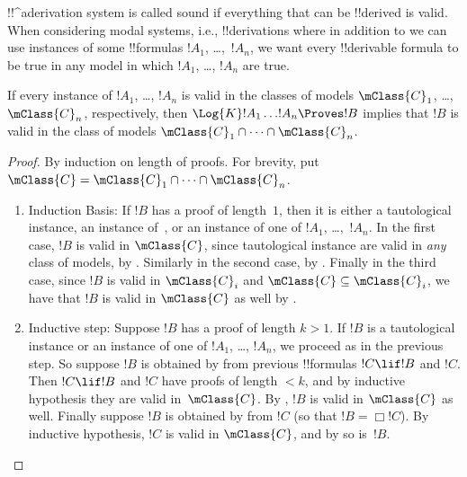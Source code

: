 \documentclass[../../../include/open-logic-section]{subfiles}
\begin{document}


!!^a{derivation} system is called sound if everything that can be
!!{derive}d is valid. When considering modal systems, i.e.,
!!{derivation}s where in addition to  we can use instances of
some !!{formula}s $!A_1$, \dots,~$!A_n$, we want every !!{derivable}
formula to be true in any model in which $!A_1$, \dots, $!A_n$ are
true.  

\begin{thm}
  If every instance of $!A_1$, \dots, $!A_n$ is valid in the
  classes of models $\mClass{C}_1$, \dots, $\mClass{C}_n$,
  respectively, then $\Log{K}!A_1\dots !A_n
  \Proves !B$ implies that $!B$ is valid in the class of
  models $\mClass{C}_1 \cap \dots \cap \mClass{C}_n$.
\end{thm}

\begin{proof}
  By induction on length of proofs. For brevity, put $\mClass{C} =
  \mClass{C}_1 \cap \dots \cap \mClass{C}_n$.
  \begin{enumerate}
  \item Induction Basis: If $!B$ has a proof of length~$1$, then it is
    either a tautological instance, an instance
    of~, or an instance of
    one of $!A_1$, \dots,~$!A_n$. In the first case, $!B$ is valid in
    $\mClass{C}$, since tautological instance are valid in \emph{any}
    class of models, by . Similarly
    in the second case, by
    . Finally in the third case,
    since $!B$ is valid in $\mClass{C}_i$ and $\mClass{C} \subseteq
    \mClass{C}_i$, we have that $!B$ is valid in $\mClass{C}$ as well
    by .
  \item Inductive step: Suppose $!B$ has a proof of length $k>1$. If
    $!B$ is a tautological instance or an instance of one of $!A_1$,
    \dots, $!A_n$, we proceed as in the previous step. So suppose $!B$ is
    obtained by \MP{} from previous !!{formula}s $!C \lif !B$ and
    $!C$. Then $!C \lif !B$ and $!C$ have proofs of length $<k$, and
    by inductive hypothesis they are valid in~$\mClass{C}$. By
    , $!B$ is valid in $\mClass{C}$ as
    well. Finally suppose $!B$ is obtained by \Nec{} from $!C$ (so
    that $!B = \Box!C$). By inductive hypothesis, $!C$ is valid in
    $\mClass{C}$, and by  so is~$!B$.
  \end{enumerate}
\end{proof}
\end{document}
